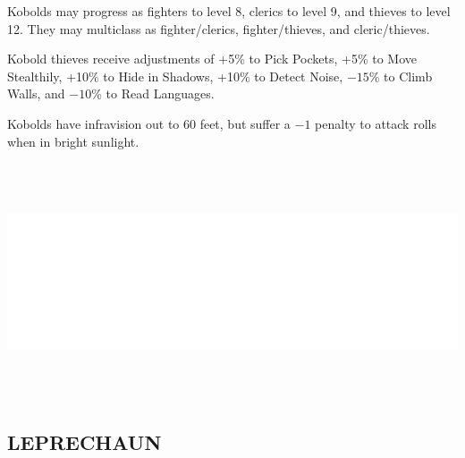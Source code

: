 \begin{multicols}{2}
\begin{minipage}{\columnwidth}
\end{minipage}

Kobolds may progress as fighters to level 8, clerics to level 9, and thieves to level 12. They may multiclass as fighter/clerics, fighter/thieves, and cleric/thieves.

Kobold thieves receive adjustments of +5\% to Pick Pockets, +5\% to Move Stealthily, +10\% to Hide in Shadows, +10\% to Detect Noise, $-15$\% to Climb Walls, and $-10$\% to Read Languages.

Kobolds have infravision out to 60 feet, but suffer a $-1$ penalty to attack rolls when in bright sunlight.

\noindent\includegraphics[width=\columnwidth, height=2.75in]{testblock.pdf}

\noindent
\begin{minipage}{\columnwidth}

\vspace{1em}

\subsection{LEPRECHAUN}


\end{minipage}
\end{multicols}
